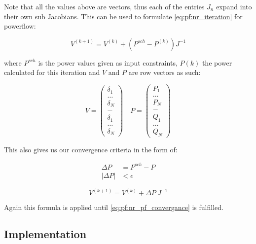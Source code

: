 Note that all the values above are vectors, thus each of the entries $J_n$ expand into
their own sub Jacobians.
This can be used to formulate \ref{eq:pf:nr_iteration} for powerflow:

\begin{equation}
    V^{(k+1)} = V^{(k)} + (P^{sch} - P^{(k)})J^{-1}
\end{equation}

where $P^{sch}$ is the power values given as input constraints, $P(k)$ the power
calculated for this iteration and $V$ and $P$ are row vectors as such:

\begin{equation}
    V = 
    \begin{pmatrix}
        \delta_1\\
        \dots\\
        \delta_N\\
        -\\
        \delta_1\\
        \dots\\
        \delta_N
    \end{pmatrix}
    \quad
    P = 
    \begin{pmatrix}
        P_1\\
        \dots\\
        P_N\\
        -\\
        Q_1\\
        \dots\\
        Q_N
    \end{pmatrix}
\end{equation}

This also gives us our convergence criteria in the form of:

\begin{align}
    \Delta P &= P^{sch} - P\\
    |\Delta P| &< \epsilon
    \label{eq:pf:nr_pf_convergance}
\end{align}

\begin{equation}
    V^{(k+1)} = V^{(k)} + \Delta P \ J^{-1}
\end{equation}

Again this formula is applied until \ref{eq:pf:nr_pf_convergance} is fulfilled.

\subsection{Implementation}

